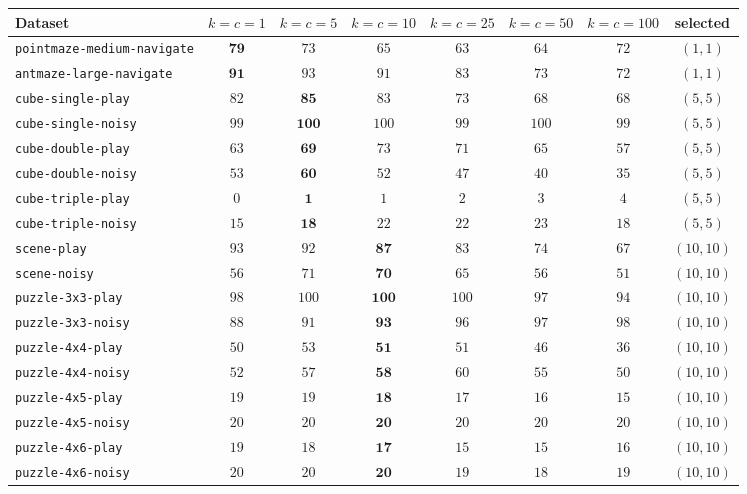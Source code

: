 \begin{tabular}{lccccccc}
\toprule
Dataset & $k{=}c{=}1$ & $k{=}c{=}5$ & $k{=}c{=}10$ & $k{=}c{=}25$ & $k{=}c{=}50$ & $k{=}c{=}100$ & selected \\
\midrule
\texttt{pointmaze-medium-navigate} & $\mathbf{79}$ & $73$ & $65$ & $63$ & $64$ & $72$ & $(1,1)$ \\
\texttt{antmaze-large-navigate} & $\mathbf{91}$ & $93$ & $91$ & $83$ & $73$ & $72$ & $(1,1)$ \\
\texttt{cube-single-play} & $82$ & $\mathbf{85}$ & $83$ & $73$ & $68$ & $68$ & $(5,5)$ \\
\texttt{cube-single-noisy} & $99$ & $\mathbf{100}$ & $100$ & $99$ & $100$ & $99$ & $(5,5)$ \\
\texttt{cube-double-play} & $63$ & $\mathbf{69}$ & $73$ & $71$ & $65$ & $57$ & $(5,5)$ \\
\texttt{cube-double-noisy} & $53$ & $\mathbf{60}$ & $52$ & $47$ & $40$ & $35$ & $(5,5)$ \\
\texttt{cube-triple-play} & $0$ & $\mathbf{1}$ & $1$ & $2$ & $3$ & $4$ & $(5,5)$ \\
\texttt{cube-triple-noisy} & $15$ & $\mathbf{18}$ & $22$ & $22$ & $23$ & $18$ & $(5,5)$ \\
\texttt{scene-play} & $93$ & $92$ & $\mathbf{87}$ & $83$ & $74$ & $67$ & $(10,10)$ \\
\texttt{scene-noisy} & $56$ & $71$ & $\mathbf{70}$ & $65$ & $56$ & $51$ & $(10,10)$ \\
\texttt{puzzle-3x3-play} & $98$ & $100$ & $\mathbf{100}$ & $100$ & $97$ & $94$ & $(10,10)$ \\
\texttt{puzzle-3x3-noisy} & $88$ & $91$ & $\mathbf{93}$ & $96$ & $97$ & $98$ & $(10,10)$ \\
\texttt{puzzle-4x4-play} & $50$ & $53$ & $\mathbf{51}$ & $51$ & $46$ & $36$ & $(10,10)$ \\
\texttt{puzzle-4x4-noisy} & $52$ & $57$ & $\mathbf{58}$ & $60$ & $55$ & $50$ & $(10,10)$ \\
\texttt{puzzle-4x5-play} & $19$ & $19$ & $\mathbf{18}$ & $17$ & $16$ & $15$ & $(10,10)$ \\
\texttt{puzzle-4x5-noisy} & $20$ & $20$ & $\mathbf{20}$ & $20$ & $20$ & $20$ & $(10,10)$ \\
\texttt{puzzle-4x6-play} & $19$ & $18$ & $\mathbf{17}$ & $15$ & $15$ & $16$ & $(10,10)$ \\
\texttt{puzzle-4x6-noisy} & $20$ & $20$ & $\mathbf{20}$ & $19$ & $18$ & $19$ & $(10,10)$ \\
\bottomrule
\end{tabular}
